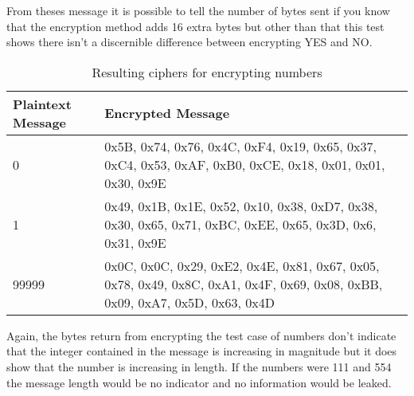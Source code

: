 From theses message it is possible to tell the number of bytes sent if you know that the encryption method adds 16 extra bytes but other than that this test shows there isn't a discernible difference between encrypting YES and NO.

\begin{table}[H]
	\centering
	\begin{tabular}{ | l | p{7cm} | }
	\hline
	Plaintext Message & Encrypted Message \\ \hline
	0 & 0x5B, 0x74, 0x76, 0x4C, 0xF4, 0x19, 0x65, 0x37, 0xC4, 0x53, 0xAF, 0xB0, 0xCE, 0x18, 0x01, 0x01, 0x30, 0x9E \\ \hline
	1 & 0x49, 0x1B, 0x1E, 0x52, 0x10, 0x38, 0xD7, 0x38, 0x30, 0x65, 0x71, 0xBC, 0xEE, 0x65, 0x3D, 0x6, 0x31, 0x9E\\ \hline
	99999 & 0x0C, 0x0C, 0x29, 0xE2, 0x4E, 0x81, 0x67, 0x05, 0x78, 0x49, 0x8C, 0xA1, 0x4F, 0x69, 0x08, 0xBB, 0x09, 0xA7, 0x5D, 0x63, 0x4D \\ \hline
	\end{tabular}
	\caption{Resulting ciphers for encrypting numbers}
	\label{tab:9999}
\end{table}

Again, the bytes return from encrypting the test case of numbers don't indicate that the integer contained in the message is increasing in magnitude but it does show that the number is increasing in length. If the numbers were 111 and 554 the message length would be no indicator and no information would be leaked.



